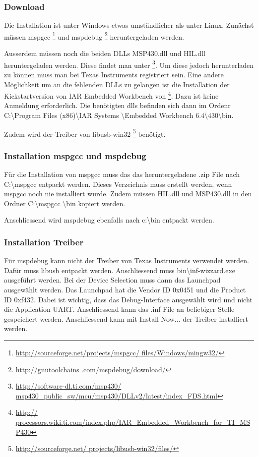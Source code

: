 \subsubsection{Download}
Die Installation ist unter Windows etwas umständlicher als unter Linux. 
Zunächst müssen mspgcc \footnote{\url{http://sourceforge.net/projects/mspgcc/
files/Windows/mingw32/}} und mspdebug \footnote{\url{http://gnutoolchains
.com/mspdebug/download/}} heruntergeladen werden. 

Ausserdem müssen noch die beiden DLLs MSP430.dll und HIL.dll heruntergeladen 
werden. Diese findet man unter \footnote{\url{http://software-dl.ti.com/msp430/
msp430_public_sw/mcu/msp430/DLLv2/latest/index_FDS.html}}. Um diese jedoch 
herunterladen zu können muss man bei Texas Instruments registriert sein. Eine 
andere Möglichkeit um an die fehlenden DLLs zu gelangen ist die Installation 
der Kickstartversion von IAR Embedded Workbench von \footnote{\url{http://
processors.wiki.ti.com/index.php/IAR_Embedded_Workbench_for_TI_MSP430}}. Dazu 
ist keine Anmeldung erforderlich. Die benötigten dlls befinden sich dann im 
Ordenr C:\textbackslash Program Files (x86)\textbackslash IAR Systems
\textbackslash Embedded Workbench 6.4\textbackslash 430\textbackslash bin. 

Zudem wird der Treiber von libusb-win32 \footnote{\url{http://sourceforge.net/
projects/libusb-win32/files/}} benötigt. 

\subsubsection{Installation mspgcc und mspdebug}
Für die Installation von mspgcc muss das das heruntergeladene .zip File 
nach C:\textbackslash mspgcc entpackt werden. Dieses Verzeichnis muss erstellt 
werden, wenn mspgcc noch nie installiert wurde. Zudem müssen HIL.dll und 
MSP430.dll in den Ordner C:\textbackslash mspgcc \textbackslash bin kopiert 
werden. 

Anschliessend wird mspdebug ebenfalls nach c:\textbackslash bin entpackt 
werden. 

\subsubsection{Installation Treiber}
Für mspdebug kann nicht der Treiber von Texas Instruments verwendet werden. 
Dafür muss libusb entpackt werden. Anschliessend muss 
bin\textbackslash inf-wizzard.exe ausgeführt werden. Bei der Device Selection
muss dann das Launchpad ausgewählt werden. Das Launchpad hat die Vendor ID 
0x0451 und die Product ID 0xf432. Dabei ist wichtig, dass das Debug-Interface
ausgewählt wird und nicht die Application UART. Anschliessend kann das .inf 
File an beliebiger Stelle gespeichert werden. Anschliessend kann mit Install 
Now... der Treiber installiert werden. 

